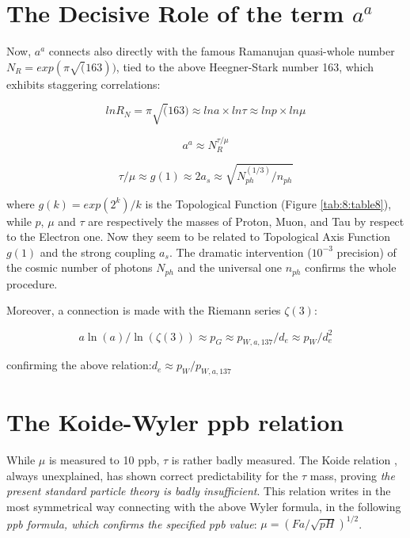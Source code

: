 \documentclass[a4paper,9pt]{article}
\begin{document}
\section{The Decisive Role of the term $a^a$ }





Now, $a^a$ connects also directly with the famous Ramanujan quasi-whole number $N_R = exp(\pi \sqrt(163))$, tied to the above Heegner-Stark number 163, which exhibits staggering correlations:



\begin{equation}
lnR_N = \pi \sqrt(163)  \approx lna \times ln\tau  \approx  lnp \times ln\mu
\end{equation}

\begin{equation}
a^a \approx N_R^{\tau/\mu} 
\end{equation}

\begin{equation}
\tau/\mu   \approx g(1) \approx  2a_s \approx \sqrt {N_{ph}^(1/3)/n_{ph}}
\end{equation}

where $g(k) = exp(2^k)/k$ is the Topological Function (Figure \ref{tab:8:table8}), while $p$, $\mu$ and $\tau$ are respectively the masses of Proton, Muon, and Tau by respect to the Electron one.  Now they seem to be related to Topological Axis Function $g(1)$ and the strong coupling $a_s$. The dramatic intervention ($10^{-3}$ precision) of the cosmic number of photons $N_{ph}$ and the universal one $n_{ph}$ confirms the whole procedure.



Moreover, a connection is made with the Riemann series $\zeta(3)$:

\begin{equation}
a\ln(a)/\ln(\zeta(3)) \approx p_G \approx p_{W,a,137}/d_e \approx p_W/d_e^2
\end{equation}

confirming the above relation:$d_e \approx p_W /p_{W, a, 137}$







\section {The Koide-Wyler ppb relation}

While $\mu$ is measured to 10 ppb, $\tau$ is rather badly measured. The Koide relation \cite{Koide}, always unexplained, has shown correct predictability for the $\tau$ mass, proving \textit{the present standard particle theory is badly insufficient}. This relation writes in the most symmetrical way connecting with the above Wyler formula, in the following \textit{ppb formula, which confirms the specified ppb value}: $\mu = (Fa/\sqrt{pH})^{1/2}$\cite{Sanchez}.
\end{document}
